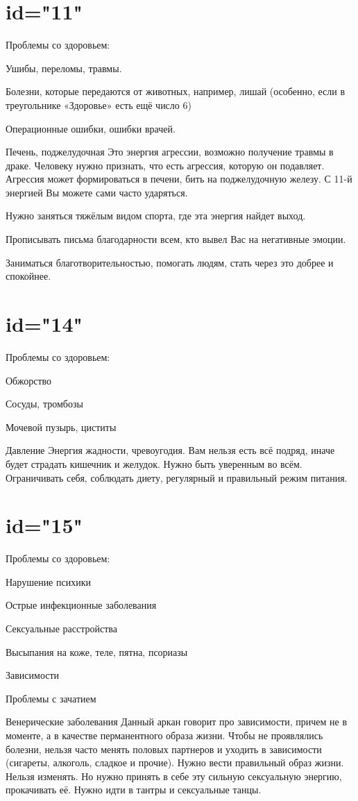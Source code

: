 \section{id="11"}{Проблемы со здоровьем:}
\item Ушибы, переломы, травмы.
\item Болезни, которые передаются от животных, например, лишай (особенно, 
если в треугольнике «Здоровье» есть ещё число 6)
\item Операционные ошибки, ошибки врачей.
\item Печень, поджелудочная
Это энергия агрессии, возможно получение травмы в драке. 
Человеку нужно признать, что есть агрессия, которую он подавляет. 
Агрессия может формироваться в печени, бить на поджелудочную железу. 
С 11-й энергией Вы можете сами часто ударяться. 
\item Нужно заняться тяжёлым видом спорта, где эта энергия найдет выход. 
\item Прописывать письма благодарности всем, кто вывел Вас на негативные эмоции.
\item Заниматься благотворительностью, помогать людям, стать через это добрее и спокойнее.

\endsection

\section{id="14"}{Проблемы со здоровьем:}
\item Обжорство
\item Сосуды, тромбозы
\item Мочевой пузырь, циститы
\item Давление
Энергия жадности, чревоугодия. 
Вам нельзя есть всё подряд, иначе будет страдать кишечник и желудок. 
Нужно быть уверенным во всём. Ограничивать себя, соблюдать диету, 
регулярный и правильный режим питания.
\endsection

\section{id="15"}{Проблемы со здоровьем:}
\item Нарушение психики
\item Острые инфекционные заболевания
\item Сексуальные расстройства
\item Высыпания на коже, теле, пятна, псориазы
\item Зависимости
\item Проблемы с зачатием
\item Венерические заболевания
Данный аркан говорит про зависимости, причем не в моменте, а в качестве 
перманентного образа жизни. Чтобы не проявлялись болезни, нельзя часто 
менять половых партнеров и уходить в зависимости (сигареты, алкоголь, 
сладкое и прочие). Нужно вести правильный образ жизни. Нельзя изменять. 
Но нужно принять в себе эту сильную сексуальную энергию, прокачивать её. 
Нужно идти в тантры и сексуальные танцы.
\endsection

